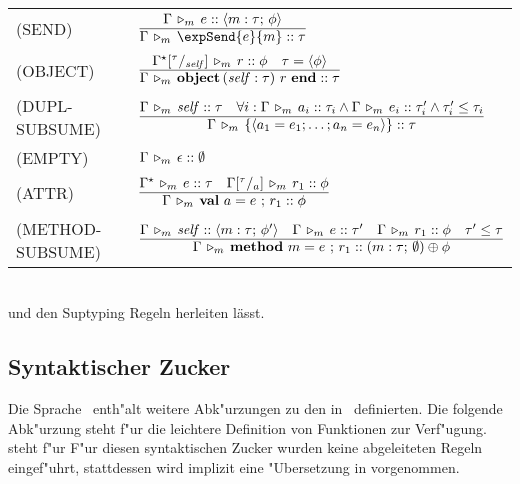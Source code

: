      \begin{tabular}{ll}
    \mbox{(SEND)\ }         & $\RULE{\Tjm{\Gamma}{e}{\typeObject{\rtypeMethod{m}{\tau}{\phi}}}}
                              {\Tjm{\Gamma}{\expSend{e}{m}}{\tau}}$ \\[4mm]
    \mbox{(OBJECT)\ }       & $\RULE{\Tjm{\Gamma^\star\SUB{\tau}{\self}}{r}{\phi}
                               \quad
                               \tau = \typeObject{\phi}}
                              {\Tjm{\Gamma}{\expObject{\self:\tau}{r}}{\tau}}$ \\[4mm]
    \mbox{(DUPL-SUBSUME)\ } & $\RULE{\Tjm{\Gamma}{\self}{\tau}
                               \quad
                               \forall i:\Tjm{\Gamma}{a_i}{\tau_i}
                                             \wedge \Tjm{\Gamma}{e_i}{\tau_i'}
                                             \wedge \tau_i' \le \tau_i}
                              {\Tjm{\Gamma}{\expDupl{a_1=e_1;\ldots;a_n=e_n}}{\tau}}$\\[4mm]
    \mbox{(EMPTY)\ }          & $\Gamma\,\triangleright_m\,\epsilon\mathrel{::}\emptyset$ \\[2mm]
    \mbox{(ATTR)\ }           & $\RULE{\Tjm{\Gamma^\star}{e}{\tau}
                                 \quad
                                 \Tjm{\Gamma\SUB{\tau}{a}}{r_1}{\phi}}
                                {\Tjm{\Gamma}{\rowVal{a}{e}{r_1}}{\phi}}$ \\[4mm]
    \mbox{(METHOD-SUBSUME)\ } & $\RULE{\Tjm{\Gamma}{\self}{\typeObject{\rtypeMethod{m}{\tau}{\phi'}}}
                                 \quad
                                 \Tjm{\Gamma}{e}{\tau'}
                                 \quad
                                 \Tjm{\Gamma}{r_1}{\phi}
                                 \quad
                                 \tau' \le \tau}
                                {\Tjm{\Gamma}{\rowMethod{m}{e}{r_1}}
                                             {(\rtypeMethod{m}{\tau}{\rtypeEmpty}) \oplus \phi}}$
  \end{tabular} \\[7mm]
  und den Suptyping Regeln herleiten l\"asst.


\subsection{Syntaktischer Zucker}

Die Sprache \LTWOO\ enth"alt weitere Abk"urzungen zu den in \LTWO\ definierten. Die folgende Abk"urzung steht f"ur die leichtere Definition von Funktionen zur Verf"ugung.
\beqns
\eeqns
steht f"ur
\beqns
\eeqns
F"ur diesen syntaktischen Zucker wurden keine abgeleiteten Regeln eingef"uhrt, stattdessen wird implizit
eine "Ubersetzung in  vorgenommen.

